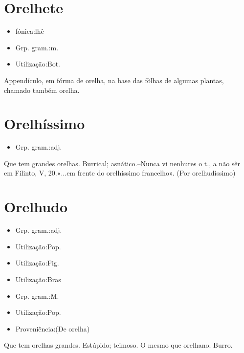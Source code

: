 \section{Orelhete}
\begin{itemize}
\item {fónica:lhê}
\end{itemize}
\begin{itemize}
\item {Grp. gram.:m.}
\end{itemize}
\begin{itemize}
\item {Utilização:Bot.}
\end{itemize}
Appendículo, em fórma de orelha, na base das fôlhas de algumas plantas, chamado também \textunderscore orelha\textunderscore .
\section{Orelhíssimo}
\begin{itemize}
\item {Grp. gram.:adj.}
\end{itemize}
Que tem grandes orelhas.
Burrical; asnático.--Nunca vi nenhures o t., a não sêr em Filinto, V, 20.«\textunderscore ...em frente do orelhissimo francelho\textunderscore ».
(Por \textunderscore orelhudíssimo\textunderscore )
\section{Orelhudo}
\begin{itemize}
\item {Grp. gram.:adj.}
\end{itemize}
\begin{itemize}
\item {Utilização:Pop.}
\end{itemize}
\begin{itemize}
\item {Utilização:Fig.}
\end{itemize}
\begin{itemize}
\item {Utilização:Bras}
\end{itemize}
\begin{itemize}
\item {Grp. gram.:M.}
\end{itemize}
\begin{itemize}
\item {Utilização:Pop.}
\end{itemize}
\begin{itemize}
\item {Proveniência:(De \textunderscore orelha\textunderscore )}
\end{itemize}
Que tem orelhas grandes.
Estúpido; teimoso.
O mesmo que \textunderscore orelhano\textunderscore .
Burro.
